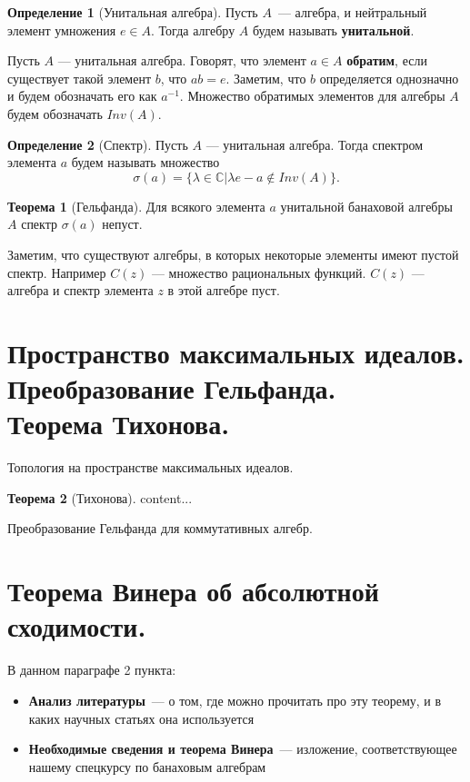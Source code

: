 \documentclass[12pt]{extarticle}
\theoremstyle{definition}
\newtheorem{theorem}{\indent Теорема}[section]
\newtheorem{definition}{\indent Определение}[section]
\begin{document}
        \begin{definition}[Унитальная алгебра]\label{def:Banakh_algebra}
        Пусть $A$~--- алгебра, и нейтральный элемент умножения $e\in A$. Тогда алгебру $A$ будем называть \textbf{унитальной}.
        \end{definition}
        Пусть $A$ --- унитальная алгебра.
        Говорят, что элемент $a\in A$ \textbf{обратим}, если существует такой элемент $b$, что $a b = e$. Заметим, что $b$ определяется однозначно и будем обозначать его как $a^{-1}$. Множество обратимых элементов для алгебры $A$ будем обозначать $Inv(A)$.
        \begin{definition}[Спектр]\label{def:Spectrum} Пусть $A$ --- унитальная алгебра. Тогда спектром элемента $a$ будем называть множество
        \begin{equation*}
            \sigma(a) = \{\lambda \in \mathbb{C}| \lambda e - a \notin Inv(A)\}.
        \end{equation*}
        \end{definition}
        


        \begin{theorem}[Гельфанда]
            Для всякого элемента $a$ унитальной банаховой алгебры $A$ спектр $\sigma(a)$ непуст.
        \end{theorem}

        Заметим, что существуют алгебры, в которых некоторые элементы имеют пустой спектр. Например $C(z)$ --- множество рациональных функций. $C(z)$ --- алгебра и спектр элемента $z$ в этой алгебре пуст. 

    \section[Пространство максимальных идеалов]{Пространство максимальных идеалов. Преобразование Гельфанда.\\Теорема Тихонова.}
        Топология на пространстве максимальных идеалов.
        \begin{theorem}[Тихонова]\label{th:Tikhonov}
            content...
        \end{theorem}
        Преобразование Гельфанда для коммутативных алгебр.

    \section[Теорема Винера.]{Теорема Винера об абсолютной сходимости.}
    В данном параграфе 2 пункта:
	\begin{itemize}
		\item \textbf{Анализ литературы}~--- о том, где можно прочитать про эту теорему, и в каких научных статьях она используется
		\item \textbf{Необходимые сведения и теорема Винера}~--- изложение, соответствующее нашему спецкурсу по банаховым алгебрам
	\end{itemize}
\end{document}
